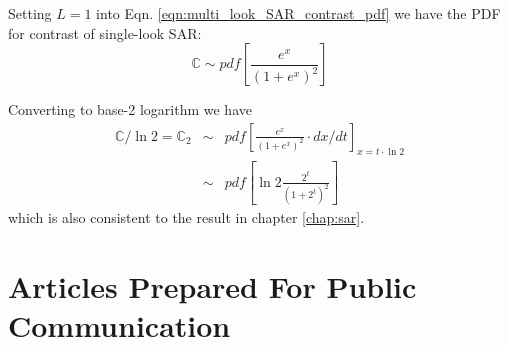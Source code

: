 Setting $L=1$ into Eqn. \ref{eqn:multi_look_SAR_contrast_pdf} 
we have the PDF for contrast of single-look SAR:
\begin{equation}
  \mathbb{C} \sim pdf \left[ \frac{e^{x}}{(1+e^x)^{2}} \right]
\end{equation}

Converting to base-2 logarithm we have
\begin{eqnarray*}
  \mathbb{C} / \ln{2} = \mathbb{C}_2 &\sim& pdf \left[ \frac{e^{x}}{(1+e^x)^{2}} \cdot dx/dt \right]_{x=t \cdot \ln{2}} \\
     &\sim& pdf \left[ \ln{2} \frac{2^t}{(1+2^t)^{2}}  \right] 
\end{eqnarray*}
which is also consistent to the result in chapter \ref{chap:sar}.

\chapter{Articles Prepared For Public Communication}


